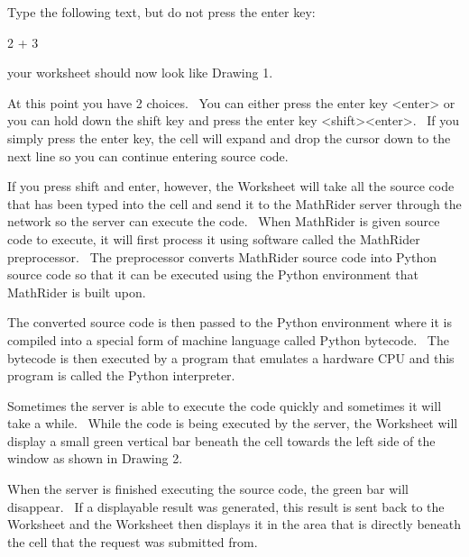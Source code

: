 \documentclass[12pt,twoside]{book}
\begin{document}
\bigskip

Type the following text, but do not press the enter key:


\bigskip

2 + 3


\bigskip

your worksheet should now look like Drawing 1.


\bigskip


\bigskip


\bigskip

At this point you have 2 choices. \ You can either press the enter key
{\textless}enter{\textgreater} or you can hold down the shift key and
press the enter key
{\textless}shift{\textgreater}{\textless}enter{\textgreater}. \ If you
simply press the enter key, the cell will expand and drop the cursor
down to the next line so you can continue entering source code.


\bigskip

If you press shift and enter, however, the Worksheet will take all the
source code that has been typed into the cell and send it to the
MathRider server through the network so the server can execute the
code. \ When MathRider is given source code to execute, it will first
process it using software called the MathRider preprocessor. \ The
preprocessor converts MathRider source code into Python source code so
that it can be executed using the Python environment that MathRider is
built upon.


\bigskip

The converted source code is then passed to the Python environment where
it is compiled into a special form of machine language called Python
bytecode. \ The bytecode is then executed by a program that emulates a
hardware CPU and this program is called the Python interpreter. 


\bigskip

Sometimes the server is able to execute the code quickly and sometimes
it will take a while. \ While the code is being executed by the server,
the Worksheet will display a small green vertical bar beneath the cell
towards the left side of the window as shown in Drawing 2.


\bigskip


\bigskip

When the server is finished executing the source code, the green bar
will disappear. \ If a displayable result was generated, this result is
sent back to the Worksheet and the Worksheet then displays it in the
area that is directly beneath the cell that the request was submitted
from.
\end{document}
